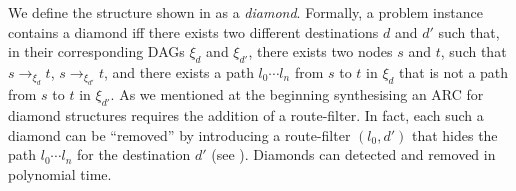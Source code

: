 We define the structure shown in 
as a \emph{diamond}. 
Formally, a problem instance contains a diamond iff there exists two different destinations $d$ and $d'$
such that, in their corresponding DAGs $\xi_d$ and $\xi_{d'}$,
there exists two nodes $s$ and $t$, such that $s\rightarrow_{\xi_d} t$,
$s\rightarrow_{\xi_{d'}} t$, and
there exists a path $l_0\cdots l_n$ from $s$ to $t$ in $\xi_d$ that is not a path from
$s$ to $t$ in $\xi_{d'}$.
As we mentioned at the beginning synthesising an ARC for  diamond structures requires
the addition of a route-filter.
In fact, each such a diamond can be ``removed'' by introducing a route-filter $(l_0, d')$ that hides
the path $l_0\cdots l_n$ for the destination $d'$ (see ).
Diamonds can detected and removed in polynomial time.
%




